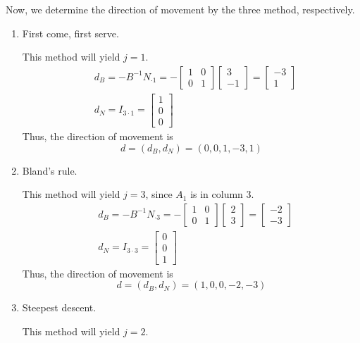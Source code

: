 \documentclass[11pt]{article}
\begin{document}
Now, we determine the direction of movement by the three method, respectively.

\begin{enumerate}
    \item First come, first serve.\par
    This method will yield $j=1$.
    \begin{align*}
    & d_B = -B^{-1}N_{\cdot 1} =-\begin{bmatrix} 1 & 0 \\ 0 & 1\end{bmatrix}\begin{bmatrix} 3 \\ -1 \end{bmatrix} = \begin{bmatrix} -3 \\ 1 \end{bmatrix} \\
    & d_N = I_{3 \cdot 1} = \begin{bmatrix} 1 \\ 0 \\ 0 \end{bmatrix}
    \end{align*}
    Thus, the direction of movement is $$d = (d_B, d_N) = (0, 0, 1, -3, 1)$$
    \item Bland's rule.\par
    This method will yield $j=3$, since $A_1$ is in column 3. 
    \begin{align*}
    & d_B = -B^{-1}N_{\cdot 3} =-\begin{bmatrix} 1 & 0 \\ 0 & 1\end{bmatrix}\begin{bmatrix} 2 \\ 3 \end{bmatrix} = \begin{bmatrix} -2 \\ -3 \end{bmatrix} \\
    & d_N = I_{3 \cdot 3} = \begin{bmatrix} 0 \\ 0 \\ 1 \end{bmatrix}
    \end{align*}
    Thus, the direction of movement is $$d = (d_B, d_N) = (1, 0, 0, -2, -3)$$
    \item Steepest descent.\par
    This method will yield $j=2$.

\end{enumerate}
\end{document}
